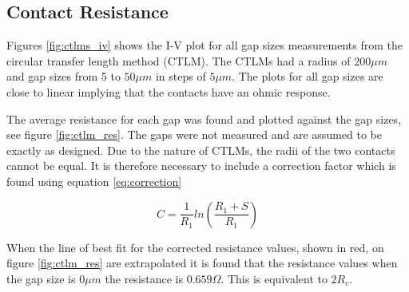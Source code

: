 \subsection{Contact Resistance}
\label{sec:test:contact}




%

Figures \ref{fig:ctlms_iv} shows the I-V plot for all gap sizes measurements from the circular transfer length method (CTLM). The CTLMs had a radius of $200\mu m$ and gap sizes from 5 to $50\mu m$ in steps of $5\mu m$. The plots for all gap sizes are close to linear implying that the contacts have an ohmic response.

The average resistance for each gap was found and plotted against the gap sizes, see figure \ref{fig:ctlm_res}. The gaps were not measured and are assumed to be exactly as designed. Due to the nature of CTLMs, the radii of the two contacts cannot be equal. It is therefore necessary to include a correction factor which is found using equation \ref{eq:correction}

\begin{equation}
  C = \frac{1}{R_1}ln(\frac{R_1 + S}{R_1})
  \label{eq:correction}
\end{equation}

When the line of best fit for the corrected resistance values, shown in red, on figure \ref{fig:ctlm_res} are extrapolated it is found that the resistance values when the gap size is $0\mu m$ the resistance is $0.659\Omega$. This is equivalent to $2R_c$.
